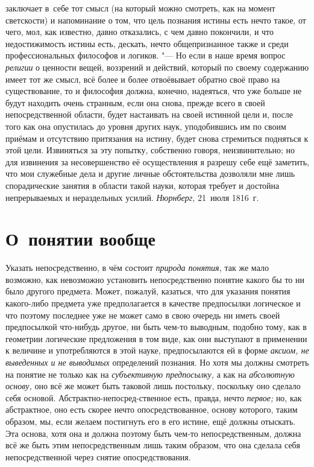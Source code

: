 заключает в~себе тот смысл (на который можно смотреть, как на момент
светскости) и напоминание о том, что цель познания истины есть нечто такое,
от чего, мол, как известно, давно отказались, с чем давно покончили, и
что недостижимость истины есть, дескать, нечто
общепризнанное также и среди профессиональных философов и логиков. "---
Но если в наше время вопрос {\em религии} о ценности
вещей, воззрений и действий, который по своему содержанию имеет тот же
смысл, всё более и более отвоёвывает обратно своё право на существование,
то и философия должна, конечно, надеяться, что уже больше не будут находить
очень странным, если она снова, прежде всего в своей непосредственной
области, будет настаивать на своей истинной цели и, после того как она
опустилась до уровня других наук, уподобившись им по своим приёмам и
отсутствию притязания на истину, будет снова стремиться подняться к этой
цели. Извиняться за эту попытку, собственно говоря, неизвинительно; но для
извинения за несовершенство её осуществления я разрешу себе ещё заметить,
что мои служебные дела и другие личные обстоятельства дозволяли мне лишь
спорадические занятия в области такой науки, которая требует и достойна
непрерываемых и нераздельных усилий.
{\em Нюрнберг,} 21~июля 1816~г.

\clearpage

\chapter[О~понятии вообще]{О~понятии вообще}

Указать непосредственно, в чём состоит {\em природа понятия,}
так же мало возможно, как невозможно установить
непосредственно понятие какого бы то ни было другого предмета. Может,
пожалуй, казаться, что для указания понятия какого-либо предмета уже
предполагается в качестве предпосылки логическое и что поэтому последнее
уже не может само в свою очередь ни иметь своей предпосылкой что-нибудь
другое, ни быть чем-то выводным, подобно тому, как в геометрии логические
предложения в том виде, как они выступают в применении к величине и
употребляются в этой науке, предпосылаются ей в форме
{\em аксиом, не выведенных и не выводимых} определений познания.
Но хотя мы должны смотреть на понятие не только как на {\em субъективную
предпосылку,} а как на {\em абсолютную основу,} оно всё же может быть
таковой лишь постольку, поскольку оно сделало себя основой.
Абстрактно-непосред-ственное есть, правда, нечто {\em первое;} но, как
абстрактное, оно есть скорее нечто опосредствованное, основу которого,
таким образом, мы, если желаем постигнуть его в его истине, ещё должны
отыскать. Эта основа, хотя она и должна поэтому быть чем-то
непосредственным, должна всё же быть этим непосредственным лишь таким
образом, что она сделала себя непосредственной через снятие
опосредствования.

